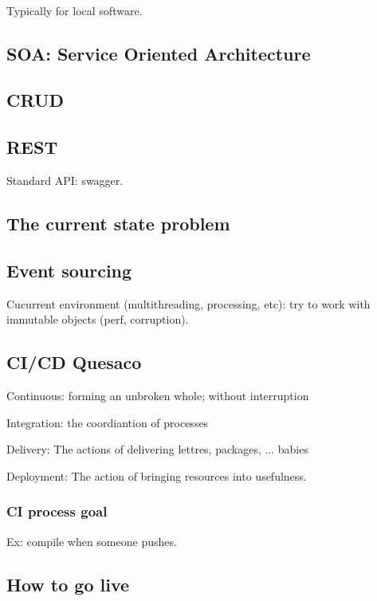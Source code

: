 \documentclass[a4paper,11pt]{article}
\begin{document}
\

Typically for local software.

\subsection{SOA: Service Oriented Architecture}

\subsection{CRUD}

\subsection{REST}

Standard API: swagger.

\subsection{The current state problem}

\subsection{Event sourcing}

Cucurrent environment (multithreading, processing, etc): try to work with
immutable objects (perf, corruption).

\subsection{CI/CD Quesaco}

Continuous: forming an unbroken whole; without interruption

Integration: the coordiantion of processes

Delivery: The actions of delivering lettres, packages, ... babies

Deployment: The action of bringing resources into usefulness.

\subsubsection{CI process goal}

Ex: compile when someone pushes.

\subsection{How to go live}
\end{document}
